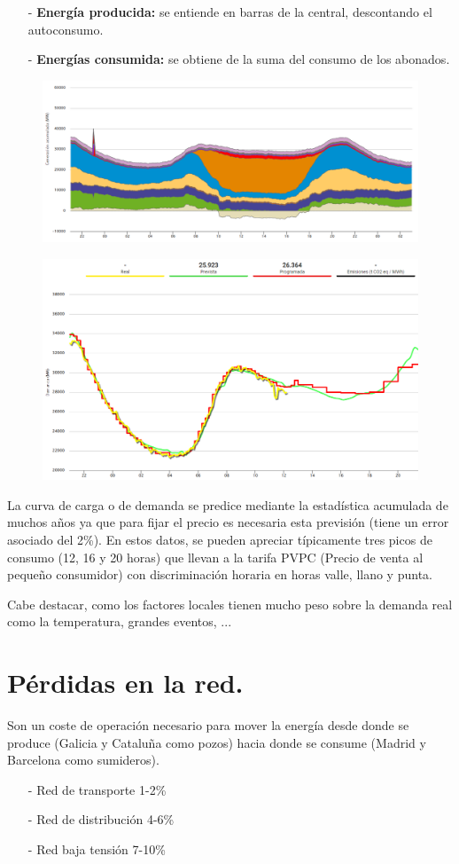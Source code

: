 \begin{itemize}
	\item [-]\textbf{Energía producida:} se entiende en barras de la central, descontando el autoconsumo.
	\item [-]\textbf{Energías consumida:} se obtiene de la suma del consumo de los abonados.
\end{itemize}
\begin{figure}[H]
	\begin{minipage}{0.5\linewidth}
		\centering
		\includegraphics[width=0.7\linewidth]{res/tema4/demandaDia}
		\label{fig:demandadia}
	\end{minipage}
	\begin{minipage}{0.5\linewidth}
		\centering
		\includegraphics[width=0.7\linewidth]{res/tema4/demandaDia1}
		\label{fig:demandadia1}
	\end{minipage}
\end{figure}
La curva de carga o de demanda se predice mediante la estadística acumulada de muchos años ya que para fijar el precio es necesaria esta previsión (tiene un error asociado del 2\%). En estos datos, se pueden apreciar típicamente tres picos de consumo (12, 16 y 20 horas) que llevan a la tarifa PVPC (Precio de venta al pequeño consumidor) con discriminación horaria en horas valle, llano y punta.


Cabe destacar, como los factores locales tienen mucho peso sobre la demanda real como la temperatura, grandes eventos, ...

\section{Pérdidas en la red.}
Son un coste de operación necesario para mover la energía desde donde se produce (Galicia y Cataluña como pozos) hacia donde se consume (Madrid y Barcelona como sumideros). 
\begin{itemize}
	\item [-] Red de transporte 1-2\%
	\item [-] Red de distribución 4-6\%
	\item [-] Red baja tensión 7-10\%
\end{itemize}

